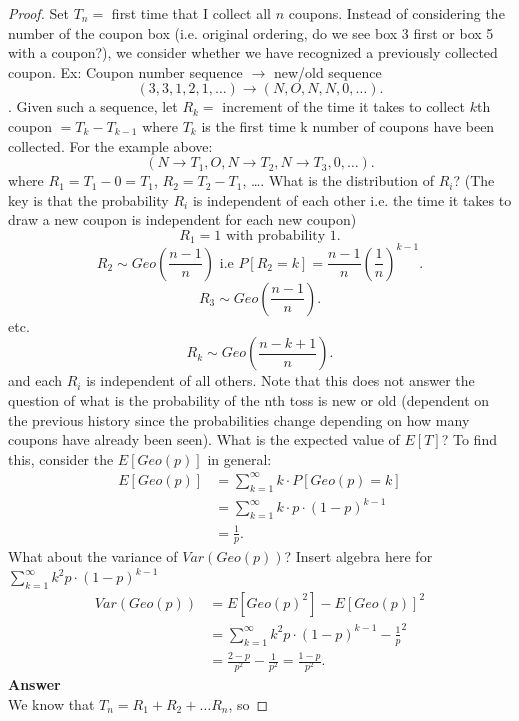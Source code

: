 \documentclass[a4paper]{article}
\begin{document}
\begin{proof}
  Set $T_n=$ first time that I collect all $n$ coupons. Instead of considering the number of the coupon box (i.e. original
  ordering, do we see box 3 first or box 5 with a coupon?), we consider whether we have recognized a previously
  collected coupon. Ex: Coupon number sequence $\to$ new/old sequence
  \[
   (3,3,1,2,1,\ldots) \to \left(N, O, N, N, 0, \ldots  \right)
  .\]. Given such a 
  sequence, let $R_k =$ increment of the time it takes to collect  $k$th coupon  $= T_k - T_{k-1}$ where $T_k$
  is the first time k number of coupons have been collected. For the example above:
  \[
   \left(N \to T_1, O, N \to T_2, N \to T_3, 0, \ldots  \right)
  .\]
  where $R_1 = T_1 - 0 = T_1$, $R_2 = T_2 - T_1$,  \ldots. What is the distribution of $R_i$? (The key is that 
  the probability $R_i$ is independent of each other i.e. the time it takes to draw a new coupon is independent
  for each new coupon)
   \[
     R_1 = 1 \text{ with probability 1}
   .\]
   \[
     R_2 \sim Geo(\frac{n-1}{n}) \text{ i.e } P[R_2=k]= \frac{n-1}{n} \left( \frac{1}{n} \right)^{k-1} 
   .\] 
  \[
  R_3 \sim Geo(\frac{n-1}{n}) 
  .\] 
  etc.
  \[
  R_k \sim Geo(\frac{n-k + 1}{n}) 
  .\] 
  and each $R_i$ is independent of all others. Note that this does not answer the question of what is the 
  probability  of the nth toss is new or old (dependent on the previous history since the probabilities change
  depending on how many coupons have already been seen). What is the expected value of $E[T]$? To find this,
  consider the $E[Geo(p)]$ in general:
   \begin{align*}
     E[Geo(p)] &= \sum_{k=1}^{\infty} k \cdot P[Geo(p) = k] \\ 
               &= \sum_{k=1}^{\infty} k \cdot p \cdot \left( 1-p \right)^{k-1} \\
               &= \frac{1}{p}
  .\end{align*}
  What about the variance of $Var(Geo(p))$?
  Insert algebra here for $\sum_{k=1}^{\infty} k^{2} p \cdot (1-p)^{k-1} $
   \begin{align*}
     Var(Geo(p)) &= E[Geo(p)^{2}] - E[Geo(p)]^2 \\
                 &= \sum_{k=1}^{\infty} k^{2} p \cdot (1-p)^{k-1} - \frac{1}{p}^2 \\
                 &= \frac{2-p}{p^{2}} - \frac{1}{p^2} = \frac{1-p}{p^2} 
  .\end{align*}
  \textbf{Answer}\\
  We know that $T_n = R_1 + R_2 + \ldots R_n$, so 

\end{proof}
\end{document}
